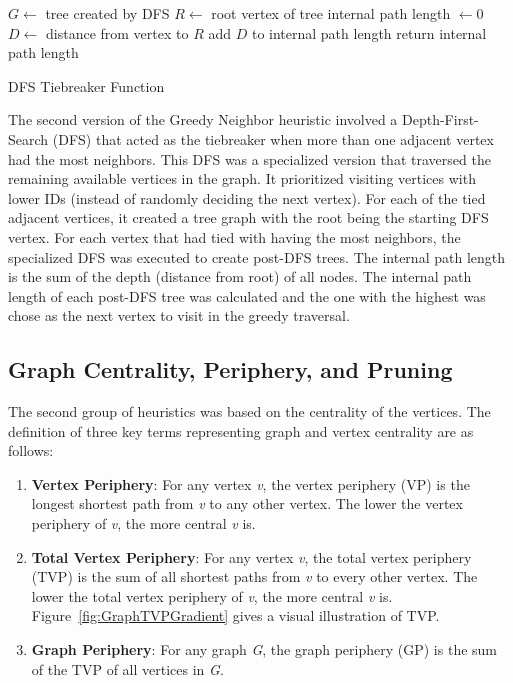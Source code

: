 \documentclass[twocolumn,showpacs,%
  nofootinbib,aps,superscriptaddress,%
  eqsecnum,prd,notitlepage,showkeys,11pt]{article}
\begin{document}
\begin{algorithm}
    \begin{algorithmic}
    \State $G \gets$ tree created by DFS
    \State $R \gets$ root vertex of tree
    \State internal path length $\gets 0$
        \State $D \gets$ distance from vertex to $R$
        \State add $D$ to internal path length
    \EndFor
    \State{}
    \State return internal path length
    
    \end{algorithmic}
    \caption{DFS Tiebreaker Function}\label{alg:DFSTiebreaker}
    \end{algorithm}

The second version of the Greedy Neighbor heuristic involved a Depth-First-Search (DFS) that acted as the tiebreaker when more than one adjacent vertex had the most neighbors. This DFS was a specialized version that traversed the remaining available vertices in the graph. It prioritized visiting vertices with lower IDs (instead of randomly deciding the next vertex). For each of the tied adjacent vertices, it created a tree graph with the root being the starting DFS vertex. For each vertex that had tied with having the most neighbors, the specialized DFS was executed to create post-DFS trees. The internal path length is the sum of the depth (distance from root) of all nodes. The internal path length of each post-DFS tree was calculated and the one with the highest was chose as the next vertex to visit in the greedy traversal. 

\subsection{Graph Centrality, Periphery, and Pruning}

The second group of heuristics was based on the centrality of the vertices. The definition of three key terms representing graph and vertex centrality are as follows:

\begin{enumerate}
    \item \textbf{Vertex Periphery}: For any vertex \textit{v}, the vertex periphery (VP) is the longest shortest path from \textit{v} to any other vertex. The lower the vertex periphery of \textit{v}, the more central \textit{v} is.

    \item \textbf{Total Vertex Periphery}:  For any vertex \textit{v}, the total vertex periphery (TVP) is the sum of all shortest paths from \textit{v} to every other vertex. The lower the total vertex periphery of \textit{v}, the more central \textit{v} is. Figure~\ref{fig:GraphTVPGradient} gives a visual illustration of TVP.

    \item \textbf{Graph Periphery}: For any graph \textit{G}, the graph periphery (GP) is the sum of the TVP of all vertices in \textit{G}.
\end{enumerate}
\end{document}
